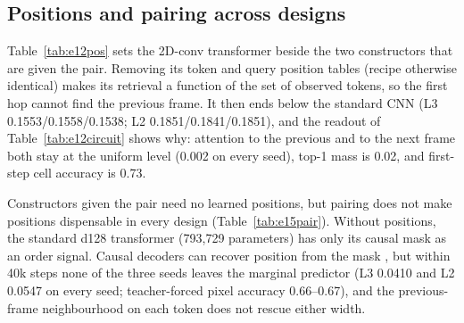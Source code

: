\documentclass[11pt]{article}
\begin{document}
\subsection{Positions and pairing across designs}

Table~\ref{tab:e12pos} sets the 2D-conv transformer beside the two constructors that are given the pair. Removing its token and query position tables (recipe otherwise identical) makes its retrieval a function of the set of observed tokens, so the first hop cannot find the previous frame. It then ends below the standard CNN (L3 0.1553/0.1558/0.1538; L2 0.1851/0.1841/0.1851), and the readout of Table~\ref{tab:e12circuit} shows why: attention to the previous and to the next frame both stay at the uniform level (0.002 on every seed), top-1 mass is 0.02, and first-step cell accuracy is 0.73.

\begin{table}[h]
\centering
\caption{\textbf{Pairing across designs.} L3 SeqAcc, filtered stream, seeds 42/43/44. Architectures, temperatures, and parameter counts differ; index alignment is not a learned positional embedding.}
\label{tab:e12pos}
\small
{}
\end{table}

Constructors given the pair need no learned positions, but pairing does not make positions dispensable in every design (Table~\ref{tab:e15pair}). Without positions, the standard d128 transformer (793{,}729 parameters) has only its causal mask as an order signal. Causal decoders can recover position from the mask \citep{haviv2022nope, kazemnejad2023nope}, but within 40k steps none of the three seeds leaves the marginal predictor (L3 0.0410 and L2 0.0547 on every seed; teacher-forced pixel accuracy 0.66--0.67), and the previous-frame neighbourhood on each token does not rescue either width.
\end{document}
